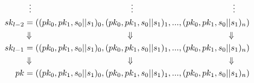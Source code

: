 \documentclass[]{scrartcl}
\makeatletter
\newcommand{\mathcenter}{\@fleqnfalse}
\makeatother
\begin{document}
\mathcenter
\begin{equation}
\begin{split}
& \hspace{0.2cm}\vdots \hspace{4.15cm}\vdots \hspace{4.15cm}\vdots \\
sk_{l-2} & = ((pk_0, pk_1, s_0||s_1)_0,(pk_0, pk_1, s_0||s_1)_1,...,(pk_0, pk_1, s_0||s_1)_n) \\
& \Downarrow \hspace{4cm}\Downarrow \hspace{4cm}\Downarrow \\
sk_{l-1} & = ((pk_0, pk_1, s_0||s_1)_0,(pk_0, pk_1, s_0||s_1)_1,...,(pk_0, pk_1, s_0||s_1)_n) \\
& \Downarrow \hspace{4cm}\Downarrow \hspace{4cm}\Downarrow \\
pk & = ((pk_0, pk_1, s_0||s_1)_0,(pk_0, pk_1, s_0||s_1)_1,...,(pk_0, pk_1, s_0||s_1)_n) \\
\end{split}
\end{equation}
\end{document}
